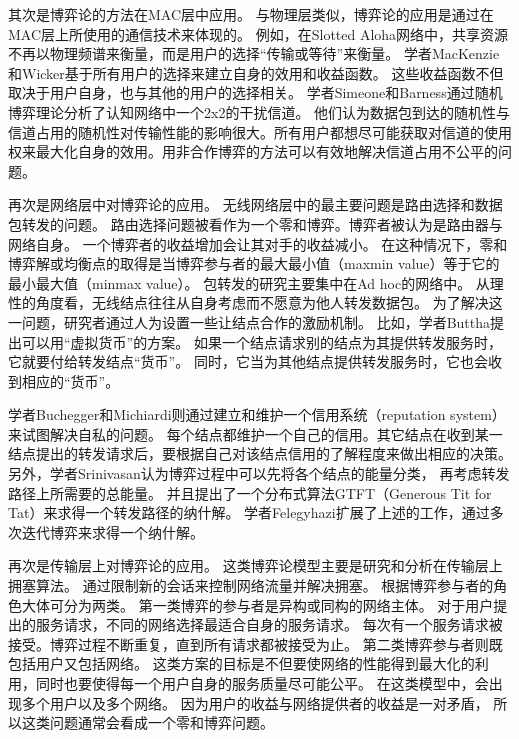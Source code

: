 其次是博弈论的方法在MAC层中应用。
与物理层类似，博弈论的应用是通过在MAC层上所使用的通信技术来体现的。
例如，在Slotted Aloha网络中，共享资源不再以物理频谱来衡量，而是用户的选择“传输或等待”来衡量。
学者MacKenzie和Wicker基于所有用户的选择来建立自身的效用和收益函数\cite{MackenzieWiker:2001}。
这些收益函数不但取决于用户自身，也与其他的用户的选择相关。
学者Simeone和Barness通过随机博弈理论分析了认知网络中一个2x2的干扰信道。
他们认为数据包到达的随机性与信道占用的随机性对传输性能的影响很大。所有用户都想尽可能获取对信道的使用权来最大化自身的效用。用非合作博弈的方法可以有效地解决信道占用不公平的问题\cite{SimeoneBarNess:2007}。

再次是网络层中对博弈论的应用。
无线网络层中的最主要问题是路由选择和数据包转发的问题。
路由选择问题被看作为一个零和博弈。博弈者被认为是路由器与网络自身。
一个博弈者的收益增加会让其对手的收益减小。
在这种情况下，零和博弈解或均衡点的取得是当博弈参与者的最大最小值（maxmin value）等于它的最小最大值（minmax value）。
包转发的研究主要集中在Ad hoc的网络中。
从理性的角度看，无线结点往往从自身考虑而不愿意为他人转发数据包\cite{Pavlidou2008}。
为了解决这一问题，研究者通过人为设置一些让结点合作的激励机制。
比如，学者Buttha提出可以用“虚拟货币”的方案\cite{Butty_Hubaux_2003}。
如果一个结点请求别的结点为其提供转发服务时，它就要付给转发结点“货币”。
同时，它当为其他结点提供转发服务时，它也会收到相应的“货币”。

学者Buchegger和Michiardi则通过建立和维护一个信用系统（reputation system）来试图解决自私的问题\cite{Buchegger_Boudec_2002}\cite{Michiardi_Molva_2002}。
每个结点都维护一个自己的信用。其它结点在收到某一结点提出的转发请求后，要根据自己对该结点信用的了解程度来做出相应的决策。
另外，学者Srinivasan认为博弈过程中可以先将各个结点的能量分类，
再考虑转发路径上所需要的总能量。
并且提出了一个分布式算法GTFT（Generous Tit for Tat）来求得一个转发路径的纳什解\cite{Srinivasan2003}。
学者Felegyhazi扩展了上述的工作，通过多次迭代博弈来求得一个纳什解\cite{FelegyhaziHubaux2006}。

再次是传输层上对博弈论的应用。
这类博弈论模型主要是研究和分析在传输层上拥塞算法。
通过限制新的会话来控制网络流量并解决拥塞。
根据博弈参与者的角色大体可分为两类。
第一类博弈的参与者是异构或同构的网络主体。
对于用户提出的服务请求，不同的网络选择最适合自身的服务请求\cite{Charilas2009}。
每次有一个服务请求被接受。博弈过程不断重复，直到所有请求都被接受为止。
第二类博弈参与者则既包括用户又包括网络。
这类方案的目标是不但要使网络的性能得到最大化的利用，同时也要使得每一个用户自身的服务质量尽可能公平。
在这类模型中，会出现多个用户以及多个网络。
因为用户的收益与网络提供者的收益是一对矛盾，
所以这类问题通常会看成一个零和博弈问题\cite{LinChatterjee2005}\cite{VlacheasCharilas2008}。

